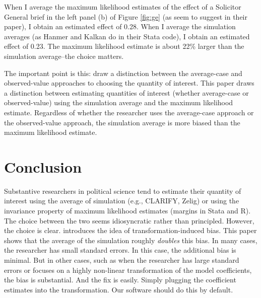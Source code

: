 \documentclass[10pt]{article}
\begin{document}
When I average the maximum likelihood estimates of the effect of a Solicitor General brief in the left panel (b) of Figure \ref{fig:ge} (as \cite{HanmerKalkan2013} seem to suggest in their paper), I obtain an estimated effect of 0.28. When I average the simulation averages (as Hanmer and Kalkan do in their Stata code), I obtain an estimated effect of 0.23. The maximum likelihood estimate is about 22\% larger than the simulation average--the choice matters.

The important point is this: \cite{HanmerKalkan2013} draw a distinction between the average-case and observed-value approaches to choosing the quantity of interest. This paper draws a distinction between estimating quantities of interest (whether average-case or observed-value) using the simulation average and the maximum likelihood estimate. Regardless of whether the researcher uses the average-case approach or the observed-value approach, the simulation average is more biased than the maximum likelihood estimate.

\section*{Conclusion}

Substantive researchers in political science tend to estimate their quantity of interest using the average of simulation (e.g., CLARIFY, Zelig) or using the invariance property of maximum likelihood estimates (margins in Stata and R). 
The choice between the two seems idiosyncratic rather than principled. 
However, the choice is clear. 
\cite{Rainey2017} introduces the idea of transformation-induced bias. 
This paper shows that the average of the simulation roughly \textit{doubles} this bias.
In many cases, the researcher has small standard errors. 
In this case, the additional bias is minimal. 
But in other cases, such as when the researcher has large standard errors or focuses on a highly non-linear transformation of the model coefficients, the bias is substantial. 
And the fix is easily. 
Simply plugging the coefficient estimates into the transformation. 
Our software should do this by default. 


\singlespace 
\small


\end{document}
